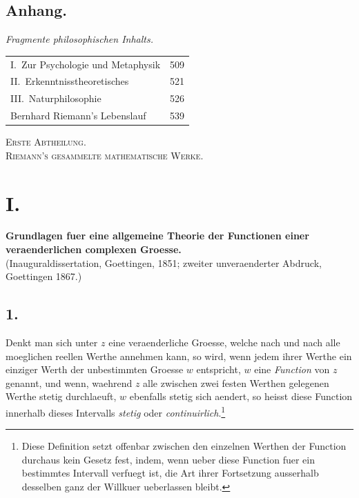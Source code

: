 \documentclass[12pt,a4paper]{book}
\theoremstyle{definition}
\theoremstyle{remark}
\begin{document}
\subsection*{Anhang.}

\textit{Fragmente philosophischen Inhalts.}

\begin{longtable}{p{12cm}r}
I.\ Zur Psychologie und Metaphysik & 509\\
II.\ Erkenntnisstheoretisches & 521\\
III.\ Naturphilosophie & 526\\[0.5em]
Bernhard Riemann's Lebenslauf & 539\\
\end{longtable}

\clearpage

\begin{center}
{\Large\textsc{Erste Abtheilung.}}\\[1em]
{\large\textsc{Riemann's gesammelte mathematische Werke.}}
\end{center}

\clearpage

\section*{I.}

\begin{center}
{\Large\textbf{Grundlagen fuer eine allgemeine Theorie der Functionen einer veraenderlichen complexen Groesse.}}\\[0.5em]
(Inauguraldissertation, Goettingen, 1851; zweiter unveraenderter Abdruck, Goettingen 1867.)
\end{center}

\subsection*{1.}

Denkt man sich unter $z$ eine veraenderliche Groesse, welche nach und nach alle moeglichen reellen Werthe annehmen kann, so wird, wenn jedem ihrer Werthe ein einziger Werth der unbestimmten Groesse $w$ entspricht, $w$ eine \emph{Function} von $z$ genannt, und wenn, waehrend $z$ alle zwischen zwei festen Werthen gelegenen Werthe stetig durchlaeuft, $w$ ebenfalls stetig sich aendert, so heisst diese Function innerhalb dieses Intervalls \emph{stetig} oder \emph{continuirlich}.\footnote{Diese Definition setzt offenbar zwischen den einzelnen Werthen der Function durchaus kein Gesetz fest, indem, wenn ueber diese Function fuer ein bestimmtes Intervall verfuegt ist, die Art ihrer Fortsetzung ausserhalb desselben ganz der Willkuer ueberlassen bleibt.}
\end{document}
